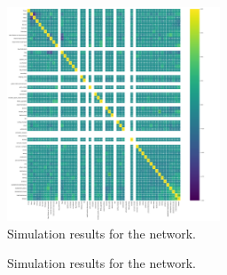 \documentclass[conference,compsoc]{IEEEtran}
\begin{document}
\begin{figure}[!t]
\centering
\includegraphics[width=2.5in]{feature_correlation.png}
\caption{Simulation results for the network.}
\label{fig_sim}
\end{figure}

\begin{figure}[!t]
\centering
{}
\hfil
{}
\caption{Simulation results for the network.}
\label{fig_sim2}
\end{figure}
\end{document}
